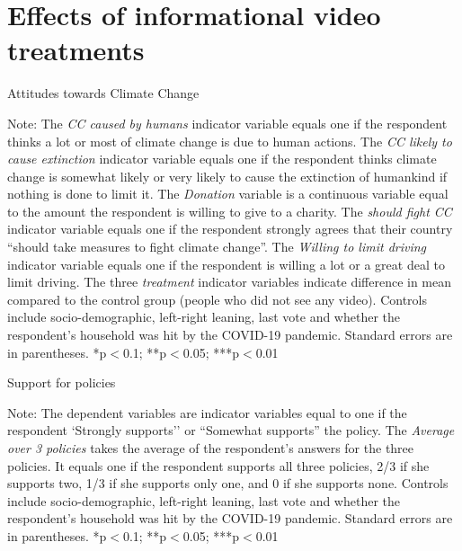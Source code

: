 \section{Effects of informational video treatments}

\begin{frame}{}%
	\begin{table}[h!]
	\caption{Attitudes towards Climate Change}
	\begin{center}
	\scalebox{.6}{}
	\end{center} %
		{\tiny Note: The \textit{CC caused by humans} indicator variable equals one if the respondent thinks a lot or most of climate change is due to human actions. The \textit{CC likely to cause extinction} indicator variable equals one if the respondent thinks climate change is somewhat likely or very likely to cause the extinction of humankind if nothing is done to limit it. The \textit{Donation} variable is a continuous variable equal to the amount the respondent is willing to give to a charity. The \textit{should fight CC} indicator variable equals one if the respondent strongly agrees that their country ``should take measures to fight climate change''. The \textit{Willing to limit driving} indicator variable equals one if the respondent is willing a lot or a great deal to limit driving. The three \textit{treatment} indicator variables indicate difference in mean compared to the control group (people who did not see any video). Controls include socio-demographic, left-right leaning, last vote and whether the respondent's household was hit by the COVID-19 pandemic. Standard errors are in parentheses.  *p$<$0.1; **p$<$0.05; ***p$<$0.01}
	\end{table}
	\end{frame}
	
	\begin{frame}{}%
	\begin{table}[h!]
	\caption{Support for policies}
	\begin{center}
	\scalebox{.7}{}
	\end{center}
		{\footnotesize Note: The dependent variables are indicator variables equal to one if the respondent `Strongly supports'' or ``Somewhat supports'' the policy. The \textit{Average over 3 policies} takes the average of the respondent's answers for the three policies. It equals one if the respondent supports all three policies, 2/3 if she supports two, 1/3 if she supports only one, and 0 if she supports none. %
		\newline Controls include socio-demographic, left-right leaning, last vote and whether the respondent's household was hit by the COVID-19 pandemic. Standard errors are in parentheses. *p$<$0.1; **p$<$0.05; ***p$<$0.01}
	\end{table}
	\end{frame}
	
